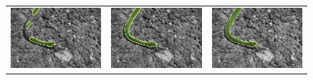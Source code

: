 \documentclass[runningheads]{llncs}
\begin{document}
\begin{figure}
\begin{tabular}{ccc}
		\includegraphics[scale=0.2]{images/segmentation/bc/snake/gc-seg.png} &
		\includegraphics[scale=0.2]{images/segmentation/bc/snake/corrected-seg.png} &
		\includegraphics[scale=0.2]{images/segmentation/schoenemann/snake/snake-seg.png}\\						

\end{tabular}
\end{figure}
\end{document}
